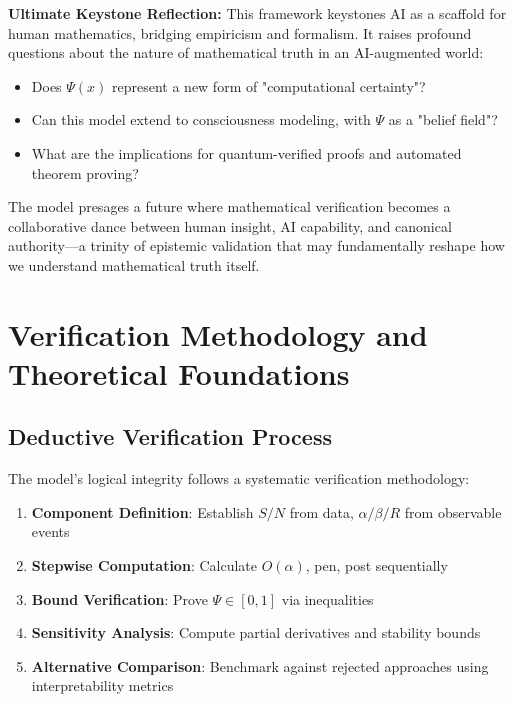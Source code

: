 \documentclass[12pt,a4paper]{article}
\theoremstyle{definition}
\theoremstyle{remark}
\begin{document}
\begin{reflectionbox}
\textbf{Ultimate Keystone Reflection:} This framework keystones AI as a scaffold for human mathematics, bridging empiricism and formalism. It raises profound questions about the nature of mathematical truth in an AI-augmented world:

\begin{itemize}
    \item Does $\Psi(x)$ represent a new form of "computational certainty"?
    \item Can this model extend to consciousness modeling, with $\Psi$ as a "belief field"?
    \item What are the implications for quantum-verified proofs and automated theorem proving?
\end{itemize}

The model presages a future where mathematical verification becomes a collaborative dance between human insight, AI capability, and canonical authority—a trinity of epistemic validation that may fundamentally reshape how we understand mathematical truth itself.
\end{reflectionbox}

\section{Verification Methodology and Theoretical Foundations}

\subsection{Deductive Verification Process}

The model's logical integrity follows a systematic verification methodology:

\begin{enumerate}
    \item \textbf{Component Definition}: Establish $S/N$ from data, $\alpha/\beta/R$ from observable events
    \item \textbf{Stepwise Computation}: Calculate $O(\alpha)$, pen, post sequentially
    \item \textbf{Bound Verification}: Prove $\Psi \in [0,1]$ via inequalities
    \item \textbf{Sensitivity Analysis}: Compute partial derivatives and stability bounds
    \item \textbf{Alternative Comparison}: Benchmark against rejected approaches using interpretability metrics
\end{enumerate}
\end{document}
